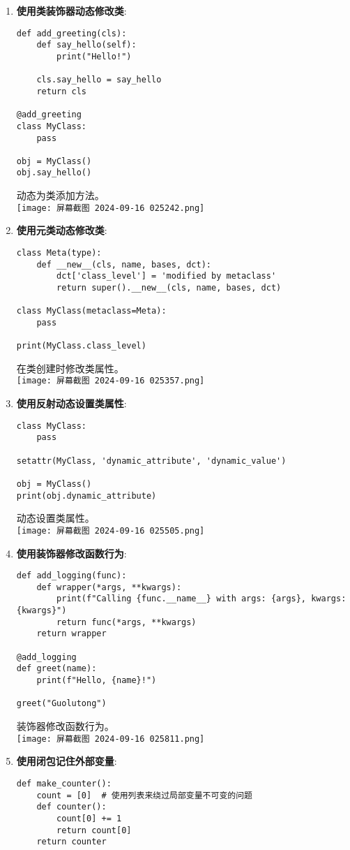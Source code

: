 \documentclass{ctexart}
\begin{document}
\begin{enumerate}[label=\arabic*.]
\item \textbf{使用类装饰器动态修改类}:
\begin{lstlisting}
def add_greeting(cls):
    def say_hello(self):
        print("Hello!")

    cls.say_hello = say_hello
    return cls

@add_greeting
class MyClass:
    pass

obj = MyClass()
obj.say_hello()
\end{lstlisting}
动态为类添加方法。\\
\texttt{[image: 屏幕截图 2024-09-16 025242.png]}
\item \textbf{使用元类动态修改类}:
\begin{lstlisting}
class Meta(type):
    def __new__(cls, name, bases, dct):
        dct['class_level'] = 'modified by metaclass'
        return super().__new__(cls, name, bases, dct)

class MyClass(metaclass=Meta):
    pass

print(MyClass.class_level)
\end{lstlisting}
在类创建时修改类属性。\\
\texttt{[image: 屏幕截图 2024-09-16 025357.png]}
\item \textbf{使用反射动态设置类属性}:
\begin{lstlisting}
class MyClass:
    pass

setattr(MyClass, 'dynamic_attribute', 'dynamic_value')

obj = MyClass()
print(obj.dynamic_attribute)
\end{lstlisting}
动态设置类属性。\\
\texttt{[image: 屏幕截图 2024-09-16 025505.png]}
\item \textbf{使用装饰器修改函数行为}:
\begin{lstlisting}
def add_logging(func):
    def wrapper(*args, **kwargs):
        print(f"Calling {func.__name__} with args: {args}, kwargs: {kwargs}")
        return func(*args, **kwargs)
    return wrapper

@add_logging
def greet(name):
    print(f"Hello, {name}!")

greet("Guolutong")
\end{lstlisting}
装饰器修改函数行为。\\
\texttt{[image: 屏幕截图 2024-09-16 025811.png]}
\item \textbf{使用闭包记住外部变量}:
\begin{lstlisting}
def make_counter():
    count = [0]  # 使用列表来绕过局部变量不可变的问题
    def counter():
        count[0] += 1
        return count[0]
    return counter


\end{lstlisting}
\end{enumerate}
\end{document}
